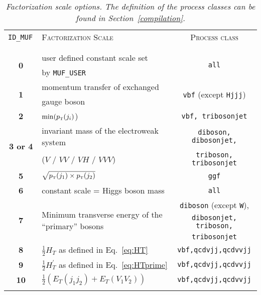 \documentclass[english,12pt]{article}
\newcommand\sss{\mathchoice%
{\displaystyle}%
{\scriptstyle}%
{\scriptscriptstyle}%
{\scriptscriptstyle}%
}
\newcommand\pt{p_{\sss\rm T}}
\begin{document}
\begin{itemize}
\begin{table}[t!]
\begin{center}
\begin{tabular}{c|p{7.5cm}|c}
{\tt ID\_MUF } & \textsc{Factorization Scale} & \textsc{Process class} \\
&&\\
\hline
&&\\
\multirow{2}{*}{\bf 0} & user defined constant scale set & \multirow{2}{*}{\tt all}\\
 & by {\tt MUF\_USER} & \\
\multirow{2}{*}{\bf 1} & momentum transfer of exchanged &  \multirow{2}{*}{{\tt vbf} (except {\tt Hjjj})} \\
 & gauge boson &  \\
\multirow{2}{*}{\bf 2} & \multirow{2}{*}{$\min(\pt(j_{i})$)} & \multirow{2}{*}{\tt vbf, tribosonjet} \\
 & & \\
\multirow{2}{*}{\bf 3 or 4} & invariant mass of the electroweak system & {\tt diboson, dibosonjet,} \\ 
 & ($V$ / $VV$ / $VH$ / $VVV$) & {\tt triboson, tribosonjet} \\ 
\multirow{2}{*}{\bf 5} &  \multirow{2}{*}{$\sqrt{ \pt(j_1) \times \pt(j_2)}$} & \multirow{2}{*}{\tt ggf}\\ 
 & & \\
\multirow{2}{*}{\bf 6} & \multirow{2}{*}{constant scale = Higgs boson mass} & \multirow{2}{*}{\tt all}\\ 
 & & \\
\multirow{3}{*}{\bf 7} & \multirow{3}{7cm}{Minimum transverse energy of the ``primary'' bosons} & {\tt diboson} (except {\tt W}), \\
 & & {\tt dibosonjet, triboson,} \\
 & & {\tt tribosonjet} \\
\multirow{2}{*}{\bf 8} & \multirow{2}{*}{$\frac{1}{2}H_T$ as defined in Eq.~\eqref{eq:HT}} & \multirow{2}{*}{\tt vbf,qcdvjj,qcdvvjj}  \\
 & & \\
\multirow{2}{*}{\bf 9} & \multirow{2}{*}{$\frac{1}{2}H_T^\prime$ as defined in Eq.~\eqref{eq:HTprime}} & \multirow{2}{*}{\tt vbf,qcdvjj,qcdvvjj}  \\
 & & \\
\multirow{2}{*}{\bf 10} & \multirow{2}{*}{$\frac{1}{2} \left( E_T(j_1j_2) + E_T(V_1 V_2) \right)$} & \multirow{2}{*}{\tt vbf,qcdvjj,qcdvvjj}  \\
 & & \\
&&\\
\hline
\end{tabular}
\caption {\em Factorization scale options. The definition of the process classes can be found in Section~\ref{compilation}.}

\end{center}
\end{table}
\end{itemize}
\end{document}
